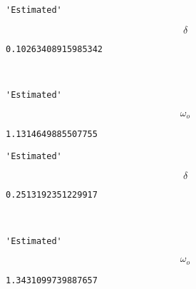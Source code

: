 \documentclass[11pt]{article}
\begin{document}
    
    
    \begin{verbatim}
'Estimated'
    \end{verbatim}

    
    $$\delta$$

    
    
    \begin{verbatim}
0.10263408915985342
    \end{verbatim}

    
    \begin{center}
    \end{center}
    { \hspace*{\fill} \\}
    
    
    \begin{verbatim}
'Estimated'
    \end{verbatim}

    
    $$ \omega_o $$

    
    
    \begin{verbatim}
1.1314649885507755
    \end{verbatim}

    
    
    \begin{verbatim}
'Estimated'
    \end{verbatim}

    
    $$\delta$$

    
    
    \begin{verbatim}
0.2513192351229917
    \end{verbatim}

    
    \begin{center}
    \end{center}
    { \hspace*{\fill} \\}
    
    
    \begin{verbatim}
'Estimated'
    \end{verbatim}

    
    $$ \omega_o $$

    
    
    \begin{verbatim}
1.3431099739887657
    \end{verbatim}
\end{document}
